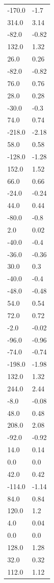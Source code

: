 \begin{longtable}{ll}
-170.0 & -1.7 \\
314.0 & 3.14 \\
-82.0 & -0.82 \\
132.0 & 1.32 \\
26.0 & 0.26 \\
-82.0 & -0.82 \\
76.0 & 0.76 \\
28.0 & 0.28 \\
-30.0 & -0.3 \\
74.0 & 0.74 \\
-218.0 & -2.18 \\
58.0 & 0.58 \\
-128.0 & -1.28 \\
152.0 & 1.52 \\
66.0 & 0.66 \\
-24.0 & -0.24 \\
44.0 & 0.44 \\
-80.0 & -0.8 \\
2.0 & 0.02 \\
-40.0 & -0.4 \\
-36.0 & -0.36 \\
30.0 & 0.3 \\
-40.0 & -0.4 \\
-48.0 & -0.48 \\
54.0 & 0.54 \\
72.0 & 0.72 \\
-2.0 & -0.02 \\
-96.0 & -0.96 \\
-74.0 & -0.74 \\
-198.0 & -1.98 \\
132.0 & 1.32 \\
244.0 & 2.44 \\
-8.0 & -0.08 \\
48.0 & 0.48 \\
208.0 & 2.08 \\
-92.0 & -0.92 \\
14.0 & 0.14 \\
0.0 & 0.0 \\
42.0 & 0.42 \\
-114.0 & -1.14 \\
84.0 & 0.84 \\
120.0 & 1.2 \\
4.0 & 0.04 \\
0.0 & 0.0 \\
128.0 & 1.28 \\
32.0 & 0.32 \\
112.0 & 1.12 \\

\end{longtable}
